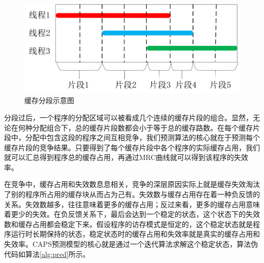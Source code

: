 \begin{figure}[htbp] 
    \centering
    \includegraphics[width=0.8\linewidth]{figures/interval.png}
    \caption{缓存分段示意图}
    \label{fig:interval}
\end{figure}

分段过后，一个程序的分配区域可以被看成几个连续的缓存片段的组合。显然，无论在何种分配组合下，总的缓存片段数都会小于等于总的缓存路数。在每个缓存片段中，分配中包含这段的程序之间互相竞争，我们预测算法的核心就在于预测每个缓存片段的竞争结果。只要得到了每个缓存片段中各个程序的实际缓存占用，我们就可以汇总得到程序总的缓存占用，再通过MRC曲线就可以得到该程序的失效率。

在竞争中，缓存占用和失效数息息相关，竞争的深层原因实际上就是缓存失效淘汰了别的程序所占用的缓存块从而占为己有。失效数与缓存占用存在着一种负反馈的关系。失效数越多，往往意味着更多的缓存占用；反过来看，更多的缓存占用意味着更少的失效。在负反馈关系下，最后会达到一个稳定的状态，这个状态下的失效数和缓存占用都会稳定下来。假设程序的访存模式是恒定的，这个稳定状态就是程序运行时长期保持的状态，稳定状态时的缓存占用和失效率就是真实的缓存占用和失效率。CAPS预测模型的核心就是通过一个迭代算法求解这个稳定状态，算法伪代码如算法\ref{alg:pred}所示。

